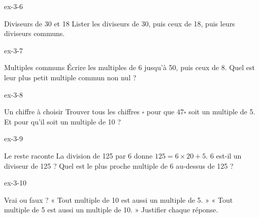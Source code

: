 \begin{blocLivre}{ex-3-6}\begin{exercice}[2]{Diviseurs de 30 et 18}
Lister les diviseurs de 30, puis ceux de 18, puis leurs diviseurs communs.
\end{exercice}\end{blocLivre}
\begin{blocLivre}{ex-3-7}\begin{exercice}[2]{Multiples communs}
Écrire les multiples de 6 jusqu’à 50, puis ceux de 8. Quel est leur plus petit multiple commun non nul ?
\end{exercice}\end{blocLivre}
\begin{blocLivre}{ex-3-8}\begin{exercice}[2]{Un chiffre à choisir}
Trouver tous les chiffres $\square$ pour que $47\square$ soit un multiple de 5. Et pour qu’il soit un multiple de 10 ?
\end{exercice}\end{blocLivre}
\begin{blocLivre}{ex-3-9}\begin{exercice}[2]{Le reste raconte}
La division de 125 par 6 donne $125=6\times20+5$. 6 est-il un diviseur de 125 ? Quel est le plus proche multiple de 6 au-dessus de 125 ?
\end{exercice}\end{blocLivre}
\begin{blocLivre}{ex-3-10}\begin{exercice}[2]{Vrai ou faux ?}
« Tout multiple de 10 est aussi un multiple de 5. » « Tout multiple de 5 est aussi un multiple de 10. » Justifier chaque réponse.
\end{exercice}\end{blocLivre}

